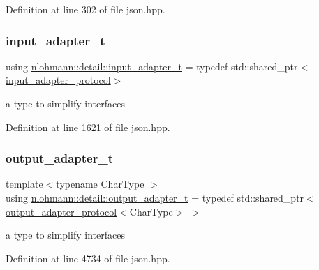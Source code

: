 Definition at line 302 of file json.\+hpp.

\mbox{\label{namespacenlohmann_1_1detail_ae132f8cd5bb24c5e9b40ad0eafedf1c2}} 
\subsubsection{\texorpdfstring{input\+\_\+adapter\+\_\+t}{input\_adapter\_t}}
{\footnotesize\ttfamily using \hyperlink{namespacenlohmann_1_1detail_ae132f8cd5bb24c5e9b40ad0eafedf1c2}{nlohmann\+::detail\+::input\+\_\+adapter\+\_\+t} = typedef std\+::shared\+\_\+ptr$<$\hyperlink{structnlohmann_1_1detail_1_1input__adapter__protocol}{input\+\_\+adapter\+\_\+protocol}$>$}



a type to simplify interfaces 



Definition at line 1621 of file json.\+hpp.

\mbox{\label{namespacenlohmann_1_1detail_a9b680ddfb58f27eb53a67229447fc556}} 
\subsubsection{\texorpdfstring{output\+\_\+adapter\+\_\+t}{output\_adapter\_t}}
{\footnotesize\ttfamily template$<$typename Char\+Type $>$ \\
using \hyperlink{namespacenlohmann_1_1detail_a9b680ddfb58f27eb53a67229447fc556}{nlohmann\+::detail\+::output\+\_\+adapter\+\_\+t} = typedef std\+::shared\+\_\+ptr$<$\hyperlink{structnlohmann_1_1detail_1_1output__adapter__protocol}{output\+\_\+adapter\+\_\+protocol}$<$Char\+Type$>$ $>$}



a type to simplify interfaces 



Definition at line 4734 of file json.\+hpp.

\mbox{\label{namespacenlohmann_1_1detail_a53a082eedad9f4729fcd8fed552a21f7}} 
